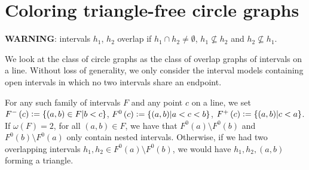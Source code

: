 \documentclass[12pt]{article}
\theoremstyle{definition}
\newcommand{\defeq}{\vcentcolon=}
\begin{document}
    \section{Coloring triangle-free circle graphs}
    
    \textbf{WARNING}: intervals
    $h_1$, $h_2$ overlap if
    $h_1 \cap h_2 \neq \emptyset$,
    $h_1 \not \subseteq h_2$ and
    $h_2 \not \subseteq h_1$.
    \vspace{4pt}

    We look at the class
    of circle graphs as the class
    of overlap graphs of intervals on a line.
    Without loss of generality,
    we only consider the interval
    models containing open intervals
    in which no two intervals
    share an endpoint.

    For any such family of intervals
    $F$ and any point $c$ on a line,
    we set $F^{-}\left(c\right) \defeq
    \left\{\left(a, b\right) \in F
    \middle| b < c\right\}$,
    $F^{0}\left(c\right) \defeq
    \left\{\left(a, b\right)
    \middle| a < c < b\right\}$,
    $F^{+}\left(c\right) \defeq
    \left\{\left(a, b\right)
    \middle| c < a\right\}$.
    If $\omega\left(F\right) = 2$,
    for all $\left(a, b\right) \in F$,
    we have that
    $F^{0}\left(a\right) \setminus F^{0}\left(b\right)$ 
    and $F^{0}\left(b\right) \setminus F^{0}\left(a\right)$
    only contain nested intervals.
    Otherwise, if we had two
    overlapping intervals $h_1, h_2 \in
    F^{0}\left(a\right) \setminus F^{0}\left(b\right)$,
    we would have $h_1, h_2, \left(a, b\right)$ 
    forming a triangle.
\end{document}
